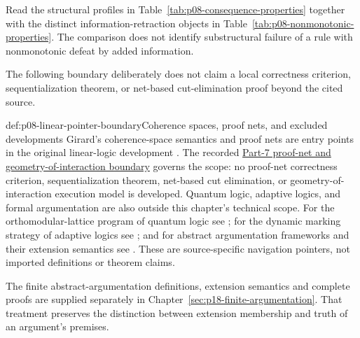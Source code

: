 Read the structural profiles in Table~\ref{tab:p08-consequence-properties}
together with the distinct
information-retraction objects in
Table~\ref{tab:p08-nonmonotonic-properties}. The comparison does not identify
substructural failure of a rule with nonmonotonic defeat by added information.


The following boundary deliberately does not claim a local correctness
criterion, sequentialization theorem, or net-based cut-elimination proof
beyond the cited source.

\begin{proofboundary}{def:p08-linear-pointer-boundary}{Coherence spaces, proof nets, and excluded developments}
Girard's coherence-space semantics and proof nets are entry points in the
original linear-logic development \cite{Girard1987}.  The recorded
\hyperref[def:p07-proof-nets-goi-boundary]{Part-7 proof-net and geometry-of-interaction
boundary} governs the scope: no proof-net correctness criterion,
sequentialization theorem, net-based cut elimination, or
geometry-of-interaction execution model is developed.  Quantum logic,
adaptive logics, and formal argumentation are also outside this chapter's
technical scope.  For the orthomodular-lattice program of quantum logic see
\textcite{BirkhoffVonNeumann1936}; for the dynamic marking strategy of adaptive
logics see \textcite{Batens2007}; and for abstract argumentation frameworks and
their extension semantics see \textcite{Dung1995}.  These are source-specific
navigation pointers, not imported definitions or theorem claims.
\end{proofboundary}

The finite abstract-argumentation definitions, extension semantics and
complete proofs are supplied separately in
Chapter~\ref{sec:p18-finite-argumentation}.  That treatment preserves the
distinction between extension membership and truth of an argument's premises.
